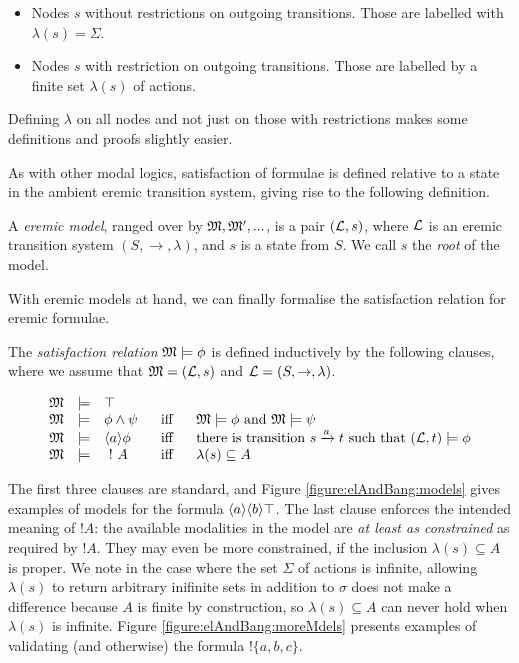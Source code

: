 \begin{itemize}

\item Nodes $s$ without restrictions on outgoing transitions. Those are
  labelled with $\lambda ( s) = \Sigma$.

\item Nodes $s$ with restriction on outgoing transitions. Those are
  labelled by a finite set $\lambda ( s)$ of actions.

\end{itemize}

\NI Defining $\lambda$ on all nodes and not just on those with
restrictions makes some definitions and proofs slightly easier.

As with other modal logics, satisfaction of formulae is defined
relative to a state in the ambient eremic transition system, giving
rise to the following definition.

\begin{definition}
A \emph{eremic model}, ranged over by $\frak{M}, \frak{M}', ...$, is a pair
$(\mathcal{L}, s)$, where $\mathcal{L}$ is an eremic transition system $(S,
\rightarrow, \lambda)$, and $s$ is a state from $S$. We call $s$ the
\emph{root} of the model.
\end{definition}

\NI With eremic models at hand, we can finally formalise the
satisfaction relation for eremic formulae.

\begin{definition}\label{ELsatisfaction}
The \emph{satisfaction relation} $\frak{M} \models \phi$ is defined
inductively by the following clauses, where we assume that $\frak{M} =
(\mathcal{L}, s)$ and $\mathcal{L} = (S, \rightarrow, \lambda)$.

\[
\begin{array}{lclcl}
  \frak{M} & \models & \top   \\
  \frak{M} & \models & \phi \land \psi &\ \mbox{ iff } \ & \frak{M}  \models \phi \mbox { and } \frak{M} \models \psi  \\
  \frak{M} & \models & \langle a \rangle \phi & \mbox{ iff } & \text{there is transition } s \xrightarrow{a} t \mbox { such that } (\mathcal{L}, t) \models \phi  \\
  \frak{M} & \models & \ ! \  A &\mbox{ iff } & \lambda(s) \subseteq A
\end{array}
\]

\end{definition}

\NI The first three clauses are standard, and Figure
\ref{figure:elAndBang:models} gives examples of models for the formula
$\langle a \rangle \langle b \rangle \top$.  The last clause enforces the intended
meaning of $!A$: the available modalities in the model are \emph{at
  least as constrained} as required by $!A$. They may even be more
constrained, if the inclusion $\lambda(s) \subseteq A$ is proper. We
note in the case where the set $\Sigma$ of actions is infinite,
allowing $\lambda(s)$ to return arbitrary inifinite sets in addition
to $\sigma$ does not make a difference because $A$ is finite by
construction, so $\lambda(s) \subseteq A$ can never hold when
$\lambda(s)$ is infinite. Figure \ref{figure:elAndBang:moreMdels}
presents examples of validating (and otherwise) the formula $!\{a, b,
c\}$.

